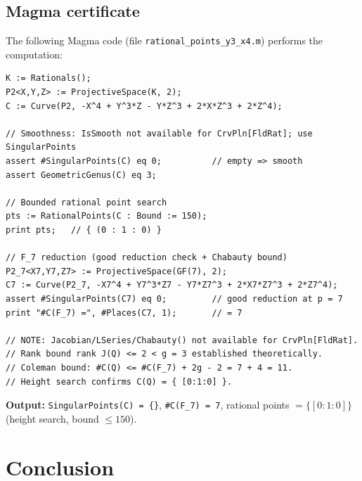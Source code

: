 \documentclass[12pt, a4paper]{article}
\theoremstyle{definition}
\begin{document}
\subsection{Magma certificate}

The following Magma code (file \texttt{rational\_points\_y3\_x4.m}) performs
the computation:

\begin{lstlisting}[language={}]
K := Rationals();
P2<X,Y,Z> := ProjectiveSpace(K, 2);
C := Curve(P2, -X^4 + Y^3*Z - Y*Z^3 + 2*X*Z^3 + 2*Z^4);

// Smoothness: IsSmooth not available for CrvPln[FldRat]; use SingularPoints
assert #SingularPoints(C) eq 0;          // empty => smooth
assert GeometricGenus(C) eq 3;

// Bounded rational point search
pts := RationalPoints(C : Bound := 150);
print pts;   // { (0 : 1 : 0) }

// F_7 reduction (good reduction check + Chabauty bound)
P2_7<X7,Y7,Z7> := ProjectiveSpace(GF(7), 2);
C7 := Curve(P2_7, -X7^4 + Y7^3*Z7 - Y7*Z7^3 + 2*X7*Z7^3 + 2*Z7^4);
assert #SingularPoints(C7) eq 0;         // good reduction at p = 7
print "#C(F_7) =", #Places(C7, 1);       // = 7

// NOTE: Jacobian/LSeries/Chabauty() not available for CrvPln[FldRat].
// Rank bound rank J(Q) <= 2 < g = 3 established theoretically.
// Coleman bound: #C(Q) <= #C(F_7) + 2g - 2 = 7 + 4 = 11.
// Height search confirms C(Q) = { [0:1:0] }.
\end{lstlisting}

\textbf{Output:} \verb|SingularPoints(C) = {}|, \verb|#C(F_7) = 7|,
rational points $= \{[0:1:0]\}$ (height search, bound $\leq 150$).

\section{Conclusion}
\end{document}
